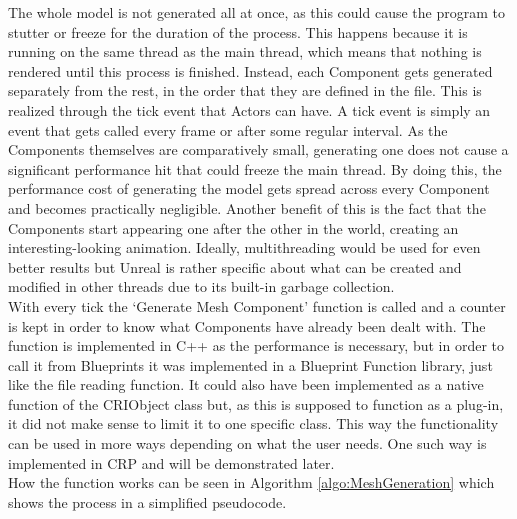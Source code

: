 The whole model is not generated all at once, as this could cause the program to stutter or freeze for the duration of the process. This happens because it is running on the same thread as the main thread, which means that nothing is rendered until this process is finished. Instead, each Component gets generated separately from the rest, in the order that they are defined in the file. This is realized through the tick event that Actors can have. A tick event is simply an event that gets called every frame or after some regular interval. As the Components themselves are comparatively small, generating one does not cause a significant performance hit that could freeze the main thread. By doing this, the performance cost of generating the model gets spread across every Component and becomes practically negligible. Another benefit of this is the fact that the Components start appearing one after the other in the world, creating an interesting-looking animation. Ideally, multithreading would be used for even better results but Unreal is rather specific about what can be created and modified in other threads due to its built-in garbage collection\cite{bib:MultiThread}.\\
With every tick the `Generate Mesh Component' function is called and a counter is kept in order to know what Components have already been dealt with. The function is implemented in C++ as the performance is necessary, but in order to call it from Blueprints it was implemented in a Blueprint Function library, just like the file reading function. It could also have been implemented as a native function of the CRIObject class but, as this is supposed to function as a plug-in, it did not make sense to limit it to one specific class. This way the functionality can be used in more ways depending on what the user needs. One such way is implemented in \acs{CRP} and will be demonstrated later.\\
How the function works can be seen in Algorithm \ref{algo:MeshGeneration} which shows the process in a simplified pseudocode.

